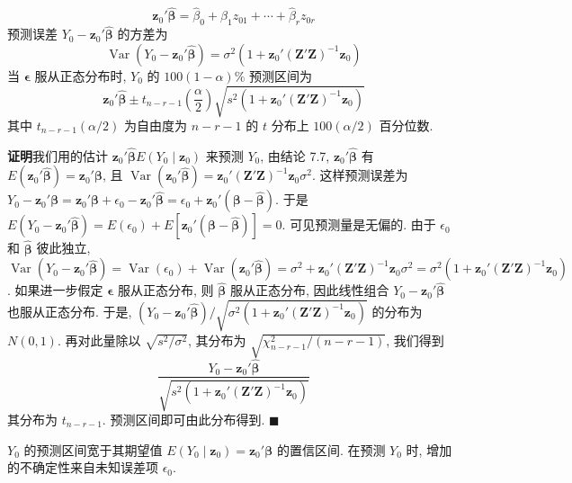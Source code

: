 
\[
\mathbf{z}_0'\hat{\boldsymbol{\beta}}=\hat{\beta}_0+\hat{\beta}_1z_{01}+\cdots+\hat{\beta}_rz_{0r}
\]
预测误差 $Y_0-\mathbf{z}_0'\hat{\boldsymbol{\beta}}$ 的方差为
\[
\operatorname{Var}(Y_0-\mathbf{z}_0'\hat{\boldsymbol{\beta}})=\sigma^2\left(1+\mathbf{z}_0'(\mathbf{Z}'\mathbf{Z})^{-1}\mathbf{z}_0\right)
\]
当 $\boldsymbol{\epsilon}$ 服从正态分布时, $Y_0$ 的 $100(1-\alpha)\%$ 预测区间为
\[
\mathbf{z}_0'\hat{\boldsymbol{\beta}}\pm t_{n-r-1}\left(\frac{\alpha}{2}\right)\sqrt{s^2\left(1+\mathbf{z}_0'(\mathbf{Z}'\mathbf{Z})^{-1}\mathbf{z}_0\right)}
\]
其中 $t_{n-r-1}(\alpha/2)$ 为自由度为 $n-r-1$ 的 $t$ 分布上 $100(\alpha/2)$ 百分位数.

\noindent\textbf{证明}\quad 我们用的估计 $\mathbf{z}_0'\hat{\boldsymbol{\beta}}E(Y_0\mid\mathbf{z}_0)$ 来预测 $Y_0$, 由结论 7.7, $\mathbf{z}_0'\hat{\boldsymbol{\beta}}$ 有 $E(\mathbf{z}_0'\hat{\boldsymbol{\beta}})=\mathbf{z}_0'\boldsymbol{\beta}$, 且 $\operatorname{Var}(\mathbf{z}_0'\hat{\boldsymbol{\beta}})=\mathbf{z}_0'(\mathbf{Z}'\mathbf{Z})^{-1}\mathbf{z}_0\sigma^2$. 这样预测误差为 $Y_0-\mathbf{z}_0'\boldsymbol{\beta}=\mathbf{z}_0'\boldsymbol{\beta}+\epsilon_0-\mathbf{z}_0'\hat{\boldsymbol{\beta}}=\epsilon_0+\mathbf{z}_0'(\boldsymbol{\beta}-\hat{\boldsymbol{\beta}})$. 于是 $E(Y_0-\mathbf{z}_0'\hat{\boldsymbol{\beta}})=E(\epsilon_0)+E\left[\mathbf{z}_0'(\boldsymbol{\beta}-\hat{\boldsymbol{\beta}})\right]=0$. 可见预测量是无偏的. 由于 $\epsilon_0$ 和 $\hat{\boldsymbol{\beta}}$ 彼此独立, $\operatorname{Var}(Y_0-\mathbf{z}_0'\hat{\boldsymbol{\beta}})=\operatorname{Var}(\epsilon_0)+\operatorname{Var}(\mathbf{z}_0'\hat{\boldsymbol{\beta}})=\sigma^2+\mathbf{z}_0'(\mathbf{Z}'\mathbf{Z})^{-1}\mathbf{z}_0\sigma^2=\sigma^2\left(1+\mathbf{z}_0'(\mathbf{Z}'\mathbf{Z})^{-1}\mathbf{z}_0\right)$. 如果进一步假定 $\boldsymbol{\epsilon}$ 服从正态分布, 则 $\hat{\boldsymbol{\beta}}$ 服从正态分布, 因此线性组合 $Y_0-\mathbf{z}_0'\hat{\boldsymbol{\beta}}$ 也服从正态分布. 于是, $(Y_0-\mathbf{z}_0'\hat{\boldsymbol{\beta}})\Big/\sqrt{\sigma^2\left(1+\mathbf{z}_0'(\mathbf{Z}'\mathbf{Z})^{-1}\mathbf{z}_0\right)}$ 的分布为 $N(0,1)$. 再对此量除以 $\sqrt{s^2/\sigma^2}$, 其分布为 $\sqrt{\chi^2_{n-r-1}/(n-r-1)}$, 我们得到
\[
\frac{Y_0-\mathbf{z}_0'\hat{\boldsymbol{\beta}}}{\sqrt{s^2\left(1+\mathbf{z}_0'(\mathbf{Z}'\mathbf{Z})^{-1}\mathbf{z}_0\right)}}
\]
其分布为 $t_{n-r-1}$. 预测区间即可由此分布得到. \hfill$\blacksquare$

$Y_0$ 的预测区间宽于其期望值 $E(Y_0\mid\mathbf{z}_0)=\mathbf{z}_0'\boldsymbol{\beta}$ 的置信区间. 在预测 $Y_0$ 时, 增加的不确定性来自未知误差项 $\epsilon_0$.

